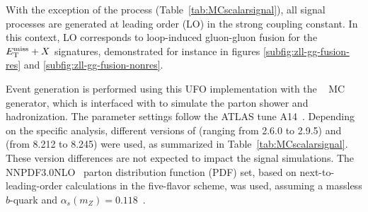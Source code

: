 \begin{table}[h!]
\centering
{}
\caption{Details of the \MGNLO generation set-up used for the \thdma signal samples, for the signatures considered in this publication.
The \texttt{Pseudoscalar\_2HDM} UFO model is used for all simulated samples except those for the \htb search, which relies on the UFO of reference~\cite{Degrande:2015vpa}.
The \hinv\ and \hlrs signatures are not listed here as no signal samples required for the re-interpretation, which in those cases relies on the branching ratio limits.}
\label{tab:MCscalarsignal}
\end{table}

With the exception of the \htb process (Table~\ref{tab:MCscalarsignal}), all signal processes are generated at leading order (LO) in the strong coupling constant. In this context, LO corresponds to loop-induced gluon-gluon fusion for the $E_{\mathrm{T}}^{\mathrm{miss}}+X$ signatures, demonstrated for instance in figures \ref{subfig:zll-gg-fusion-res} and \ref{subfig:zll-gg-fusion-nonres}.

Event generation is performed using this UFO implementation with the \MGNLO~\cite{Alwall:2014hca} MC generator, which is interfaced with \cite{Sjostrand:2014zea} to simulate the parton shower and hadronization. The parameter settings follow the ATLAS tune A14~\cite{ATL-PHYS-PUB-2014-021}. Depending on the specific analysis, different versions of \MGNLO (ranging from 2.6.0 to 2.9.5) and \PYTHIA (from 8.212 to 8.245) were used, as summarized in Table~\ref{tab:MCscalarsignal}. These version differences are not expected to impact the signal simulations. The NNPDF3.0NLO~\cite{Ball:2014uwa} parton distribution function (PDF) set, based on next-to-leading-order calculations in the five-flavor scheme, was used, assuming a massless $b$-quark and $\alpha_{s}(m_{Z}) = 0.118$~\cite{Ball:2014uwa}.

